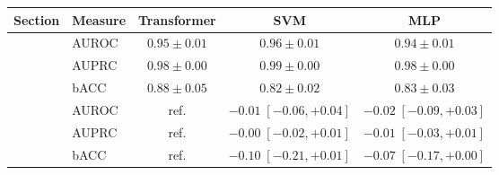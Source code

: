 \documentclass[border=6pt]{standalone}
\begin{document}
\begin{tabular}{llccc}
\toprule
Section & Measure & Transformer & SVM & MLP \\
\midrule
{} & AUROC & $0.95 \pm 0.01$ & $0.96 \pm 0.01$ & $0.94 \pm 0.01$ \\
 & AUPRC & $0.98 \pm 0.00$ & $0.99 \pm 0.00$ & $0.98 \pm 0.00$ \\
 & bACC & $0.88 \pm 0.05$ & $0.82 \pm 0.02$ & $0.83 \pm 0.03$ \\
\midrule
{} & AUROC & ref. & $-0.01 \;[-0.06, +0.04]$ & $-0.02 \;[-0.09, +0.03]$ \\
 & AUPRC & ref. & $-0.00 \;[-0.02, +0.01]$ & $-0.01 \;[-0.03, +0.01]$ \\
 & bACC & ref. & $-0.10 \;[-0.21, +0.01]$ & $-0.07 \;[-0.17, +0.00]$ \\
\bottomrule
\end{tabular}
\end{document}
